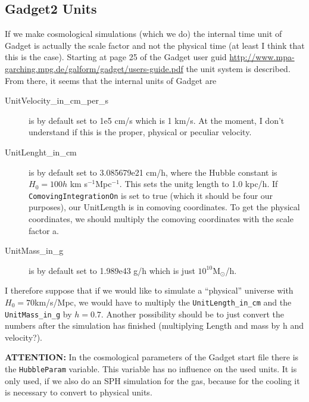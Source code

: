 \documentclass[a4paper,english,10.5pt]{scrartcl}
\begin{document}
\subsection{Gadget2 Units}
If we make cosmological simulations (which we do) the internal time unit of Gadget is actually the scale factor and not the physical time (at least I think that this is the case). Starting at page 25 of the Gadget user guid \url{http://www.mpa-garching.mpg.de/galform/gadget/users-guide.pdf} the unit system is described. From there, it seems that the internal units of Gadget are
\begin{description}
 \item[UnitVelocity\_in\_cm\_per\_s] is by default set to 1e5 cm/s which is 1 km/s. At the moment, I don't understand if this is the proper, physical or peculiar velocity.
  \item[UnitLenght\_in\_cm] is by default set to 3.085679e21 cm/h, where the Hubble constant is $H_0 = 100 h$ km s$^{-1}$Mpc$^{-1}$. This sets the unitg length to 1.0 kpc/h. If \texttt{ComovingIntegrationOn} is set to true (which it should be four our purposes), our UnitLength is in comoving coordinates. To get the physical coordinates, we should multiply the comoving coordinates with the scale factor a.
  \item[UnitMass\_in\_g] is by default set to 1.989e43 g/h which is just $10^{10}$M$_\odot$/h.
\end{description}
I therefore suppose that if we would like to simulate a ``physical'' universe with $H_0=70$km/s/Mpc, we would have to multiply the \texttt{UnitLength\_in\_cm} and the \texttt{UnitMass\_in\_g} by $h=0.7$. Another possibility should be to just convert the numbers after the simulation has finished (multiplying Length and mass by h and velocity?).

\textbf{ATTENTION:} In the cosmological parameters of the Gadget start file there is the \texttt{HubbleParam} variable. This variable has no influence on the used units. It is only used, if we also do an SPH simulation for the gas, because for the cooling it is necessary to convert to physical units.
\end{document}
